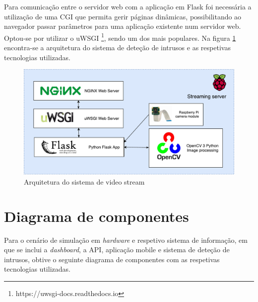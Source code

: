 Para comunicação entre o servidor web com a aplicação em Flask foi necessária a utilização de uma \ac{CGI} que permita gerir páginas dinâmicas, possibilitando ao navegador passar parâmetros para uma aplicação existente num servidor web. Optou-se por utilizar o uWSGI \footnote{https://uwsgi-docs.readthedocs.io}, sendo um dos mais populares. Na figura \ref{arquiteturavisao} encontra-se a arquitetura do sistema de deteção de intrusos e as respetivas tecnologias utilizadas.



\begin{figure}[h]
	\centering
	\includegraphics[scale = 0.5]{esquemas/videostream.pdf}
	\caption{Arquitetura do sistema de video stream}
	\label{arquiteturavisao}
\end{figure}





\newpage
\section{Diagrama de componentes}

Para o cenário de simulação em \textit{hardware} e respetivo sistema de informação, em que se inclui a \textit{dashboard}, a \ac{API}, aplicação mobile e sistema de deteção de intrusos, obtive o seguinte diagrama de componentes com as respetivas tecnologias utilizadas. 

